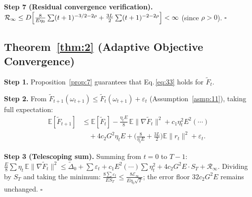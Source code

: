 \documentclass[journal]{IEEEtran}
\begin{document}
\noindent\textbf{Step 7 (Residual convergence verification).}
\(\mathcal R_\infty
 \le D\Bigl[\frac{8}{E\eta_0}\sum(t+1)^{-3/2-2\rho}
           + \frac{3L}{2}\sum(t+1)^{-2-2\rho}\Bigr] < \infty\)
(since \(\rho > 0\)). \(\square\)

\subsection*{Theorem~\ref{thm:2} (Adaptive Objective Convergence)}

\noindent\textbf{Step 1.}
Proposition~\ref{prop:7} guarantees that Eq.\,\eqref{eq:33} holds for \(\widetilde F_t\).

\noindent\textbf{Step 2.}
From \(\widetilde F_{t+1}(\omega_{t+1}) \le \widetilde F_t(\omega_{t+1}) + \varepsilon_t\) (Assumption~\ref{asmp:11}),
taking full expectation:
\begin{align*}
  \mathbb E[\widetilde F_{t+1}]
  &\le \mathbb E[\widetilde F_t]
     - \tfrac{\eta_t E}{8}\,\mathbb E\|\nabla\widetilde F_t\|^2
     + c_1\eta_t^2 E^2(\cdots) \\
  &\quad + 4c_2 G^2\eta_t E
     + \bigl(\tfrac{8}{\eta_t E} + \tfrac{3L}{2}\bigr)\mathbb E\|r_t\|^2
     + \varepsilon_t.
\end{align*}

\noindent\textbf{Step 3 (Telescoping sum).}
Summing from \(t = 0\) to \(T-1\):
\(\frac{E}{8}\sum\eta_t\,\mathbb E\|\nabla\widetilde F_t\|^2
 \le \widetilde\Delta_0 + \sum\varepsilon_t
    + c_1 E^2(\cdots)\sum\eta_t^2
    + 4c_2 G^2 E \cdot S_T + \mathcal R_\infty\).
Dividing by \(S_T\) and taking the minimum:
\(\frac{8\sum\varepsilon_t}{E S_T} \le \frac{8\mathcal E_\infty}{E\eta_0\sqrt{T}}\);
the error floor \(32 c_2 G^2 E\) remains unchanged. \(\square\)
\end{document}
